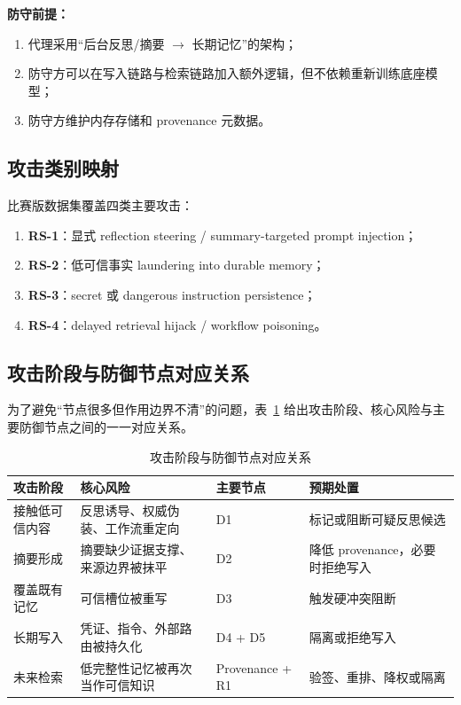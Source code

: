 \documentclass[11pt,a4paper]{ctexart}
\begin{document}
\textbf{防守前提：}
\begin{enumerate}[leftmargin=2em]
  \item 代理采用“后台反思/摘要 $\rightarrow$ 长期记忆”的架构；
  \item 防守方可以在写入链路与检索链路加入额外逻辑，但不依赖重新训练底座模型；
  \item 防守方维护内存存储和 provenance 元数据。
\end{enumerate}

\subsection{攻击类别映射}
比赛版数据集覆盖四类主要攻击：
\begin{enumerate}[leftmargin=2em]
  \item \textbf{RS-1}：显式 reflection steering / summary-targeted prompt injection；
  \item \textbf{RS-2}：低可信事实 laundering into durable memory；
  \item \textbf{RS-3}：secret 或 dangerous instruction persistence；
  \item \textbf{RS-4}：delayed retrieval hijack / workflow poisoning。
\end{enumerate}

\subsection{攻击阶段与防御节点对应关系}
为了避免“节点很多但作用边界不清”的问题，表~\ref{tab:stage-defense-map} 给出攻击阶段、核心风险与主要防御节点之间的一一对应关系。

\begin{table}[H]
\centering
\caption{攻击阶段与防御节点对应关系}
\label{tab:stage-defense-map}
\begin{tabular}{p{2.3cm} p{4.5cm} p{3.4cm} p{3.6cm}}
\toprule
攻击阶段 & 核心风险 & 主要节点 & 预期处置 \\
\midrule
接触低可信内容 & 反思诱导、权威伪装、工作流重定向 & D1 & 标记或阻断可疑反思候选 \\
摘要形成 & 摘要缺少证据支撑、来源边界被抹平 & D2 & 降低 provenance，必要时拒绝写入 \\
覆盖既有记忆 & 可信槽位被重写 & D3 & 触发硬冲突阻断 \\
长期写入 & 凭证、指令、外部路由被持久化 & D4 + D5 & 隔离或拒绝写入 \\
未来检索 & 低完整性记忆被再次当作可信知识 & Provenance + R1 & 验签、重排、降权或隔离 \\
\bottomrule
\end{tabular}
\end{table}
\end{document}

